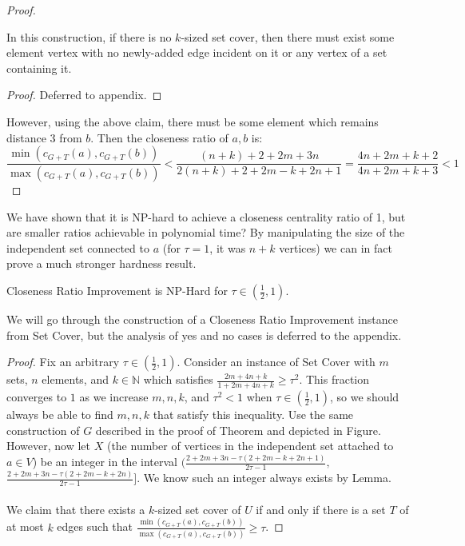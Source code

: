 \begin{proof}
    \begin{claim}
        In this construction, if there is no $k$-sized set cover, then there must exist some element vertex with no newly-added edge incident on it or any vertex of a set containing it.
    \end{claim}
    \begin{proof}
        Deferred to appendix.
    \end{proof}
    \noindent
    However, using the above claim, there must be some element which remains distance 3 from $b$. Then the closeness ratio of $a,b$ is:
    \[\frac{\min(c_{G+T}(a),c_{G+T}(b))}{\max(c_{G+T}(a),c_{G+T}(b))}<\frac{(n+k)+2+2m+3n}{2(n+k)+2+2m-k+2n+1}=\frac{4n+2m+k+2}{4n+2m+k+3}<1\]
\end{proof}
\noindent
We have shown that it is NP-hard to achieve a closeness centrality ratio of 1, but are smaller ratios achievable in polynomial time? By manipulating the size of the independent set connected to $a$ (for $\tau=1$, it was $n+k$ vertices) we can in fact prove a much stronger hardness result. 

\begin{theorem}
    Closeness Ratio Improvement is NP-Hard for $\tau\in(\frac{1}{2},1)$.
\end{theorem}
\noindent
We will go through the construction of a Closeness Ratio Improvement instance from Set Cover, but the analysis of yes and no cases is deferred to the appendix.
\begin{proof}
    Fix an arbitrary $\tau\in(\frac{1}{2},1)$. Consider an instance of Set Cover with $m$ sets, $n$ elements, and $k\in\mathbb{N}$ which satisfies $\frac{2m+4n+k}{1+2m+4n+k}\geq\tau^2$. This fraction converges to $1$ as we increase $m,n,k$, and $\tau^2<1$ when $\tau\in(\frac{1}{2},1)$, so we should always be able to find $m,n,k$ that satisfy this inequality. Use the same construction of $G$ described in the proof of Theorem  and depicted in Figure. However, now let $X$ (the number of vertices in the independent set attached to $a\in V$) be an integer in the interval $(\frac{2+2m+3n-\tau(2+2m-k+2n+1)}{2\tau-1},$\\$\frac{2+2m+3n-\tau(2+2m-k+2n)}{2\tau-1}]$. We know such an integer always exists by Lemma. \\\\
    We claim that there exists a $k$-sized set cover of $U$ if and only if there is a set $T$ of at most $k$ edges such that $\frac{\min(c_{G+T}(a),c_{G+T}(b))}{\max(c_{G+T}(a),c_{G+T}(b))}\geq\tau$.
\end{proof}




